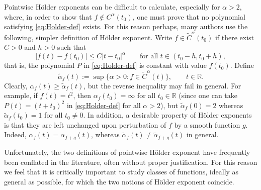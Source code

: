 \documentclass[11pt]{amsart}
\newcommand\RR{\mathbb{R}}
\newcommand{\1}{1}
\begin{document}
Pointwise H\"older exponents can be difficult to calculate, especially for $\alpha>2$, where, in order to show that $f\not\in C^\alpha(t_0)$, one must prove that no polynomial satisfying \eqref{eq:Holder-def} exists. For this reason perhaps, many authors use the following, simpler definition of H\"older exponent. Write $f\in \tilde{C}^\alpha(t_0)$ if there {exist $C>0$ and $h>0$} such that
\begin{equation*}
|f(t)-f(t_0)|\leq C|t-t_0|^\alpha \qquad\mbox{for all {$t\in(t_0-h,t_0+h)$}},
\end{equation*}
that is, the polynomial $P$ in \eqref{eq:Holder-def} is constant with value $f(t_0)$. Define
\begin{equation*}
\tilde{\alpha}_f(t):=\sup\{\alpha>0: f\in \tilde{C}^\alpha(t)\}, \qquad t\in\RR.
\end{equation*}
Clearly, $\alpha_f(t)\geq\tilde{\alpha}_f(t)$, but the reverse inequality may fail in general. For example, if $f(t)=t^2$, then $\alpha_f(t_0)=\infty$ for all $t_0\in\RR$ (since one can take $P(t)=(t+t_0)^2$ in \eqref{eq:Holder-def} for all $\alpha>2$), but $\tilde{\alpha}_f(0)=2$ whereas $\tilde{\alpha}_f(t_0)=1$ for all $t_0\neq 0$. In addition, a desirable property of H\"older exponents is that they are left unchanged upon perturbation of $f$ by a smooth function $g$. Indeed, $\alpha_f(t)=\alpha_{f+g}(t)$, whereas $\tilde{\alpha}_f(t)\neq\tilde{\alpha}_{f+g}(t)$ in general.

Unfortunately, the two definitions of pointwise H\"older exponent have frequently been conflated in the literature, often without proper justification. For this reason we feel that it is critically important to study classes of functions, ideally as general as possible, for which the two notions of H\"older exponent coincide. 
\end{document}
